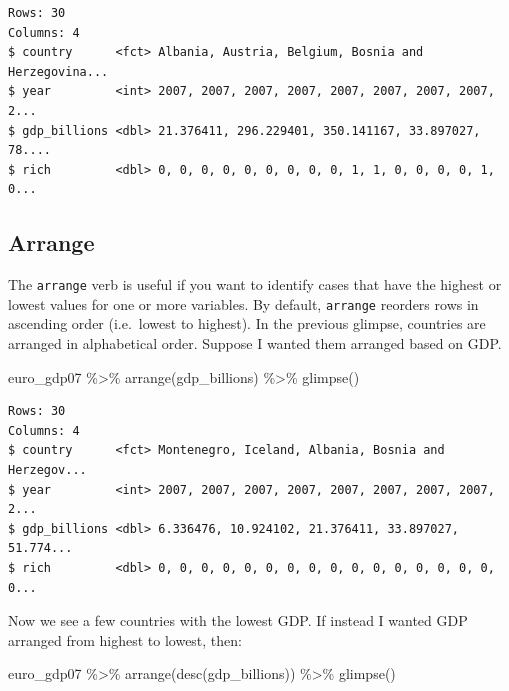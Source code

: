 \documentclass[
]{book}
\makeatletter
\newenvironment{Shaded}{\begin{snugshade}}{\end{snugshade}}
\newcommand{\FunctionTok}[1]{\textcolor[rgb]{0,0,0}{#1}}
\newcommand{\NormalTok}[1]{#1}
\newcommand{\SpecialCharTok}[1]{\textcolor[rgb]{0,0,0}{#1}}
\newenvironment{kframe}{%
\medskip{}
\setlength{\fboxsep}{.8em}
 \def\at@end@of@kframe{}%
 \ifinner\ifhmode%
  \def\at@end@of@kframe{\end{minipage}}%
  \begin{minipage}{\columnwidth}%
 \fi\fi%
 \def\FrameCommand##1{\hskip\@totalleftmargin \hskip-\fboxsep
 \colorbox{shadecolor}{##1}\hskip-\fboxsep
     \hskip-\linewidth \hskip-\@totalleftmargin \hskip\columnwidth}%
 \MakeFramed {\advance\hsize-\width
   \@totalleftmargin\z@ \linewidth\hsize
   \@setminipage}}%
 {\par\unskip\endMakeFramed%
 \at@end@of@kframe}
\renewenvironment{Shaded}{\begin{kframe}}{\end{kframe}}
\makeatother
\begin{document}
\begin{verbatim}
Rows: 30
Columns: 4
$ country      <fct> Albania, Austria, Belgium, Bosnia and Herzegovina...
$ year         <int> 2007, 2007, 2007, 2007, 2007, 2007, 2007, 2007, 2...
$ gdp_billions <dbl> 21.376411, 296.229401, 350.141167, 33.897027, 78....
$ rich         <dbl> 0, 0, 0, 0, 0, 0, 0, 0, 0, 1, 1, 0, 0, 0, 0, 1, 0...
\end{verbatim}

\hypertarget{arrange}{%
\subsection{Arrange}\label{arrange}}

The \texttt{arrange} verb is useful if you want to identify cases that have the highest or lowest values for one or more variables. By default, \texttt{arrange} reorders rows in ascending order (i.e.~lowest to highest). In the previous glimpse, countries are arranged in alphabetical order. Suppose I wanted them arranged based on GDP.

\begin{Shaded}
\begin{Highlighting}[]
\NormalTok{euro\_gdp07 }\SpecialCharTok{\%\textgreater{}\%} 
  \FunctionTok{arrange}\NormalTok{(gdp\_billions) }\SpecialCharTok{\%\textgreater{}\%} 
  \FunctionTok{glimpse}\NormalTok{()}
\end{Highlighting}
\end{Shaded}

\begin{verbatim}
Rows: 30
Columns: 4
$ country      <fct> Montenegro, Iceland, Albania, Bosnia and Herzegov...
$ year         <int> 2007, 2007, 2007, 2007, 2007, 2007, 2007, 2007, 2...
$ gdp_billions <dbl> 6.336476, 10.924102, 21.376411, 33.897027, 51.774...
$ rich         <dbl> 0, 0, 0, 0, 0, 0, 0, 0, 0, 0, 0, 0, 0, 0, 0, 0, 0...
\end{verbatim}

Now we see a few countries with the lowest GDP. If instead I wanted GDP arranged from highest to lowest, then:

\begin{Shaded}
\begin{Highlighting}[]
\NormalTok{euro\_gdp07 }\SpecialCharTok{\%\textgreater{}\%} 
  \FunctionTok{arrange}\NormalTok{(}\FunctionTok{desc}\NormalTok{(gdp\_billions)) }\SpecialCharTok{\%\textgreater{}\%} 
  \FunctionTok{glimpse}\NormalTok{()}
\end{Highlighting}
\end{Shaded}
\end{document}
